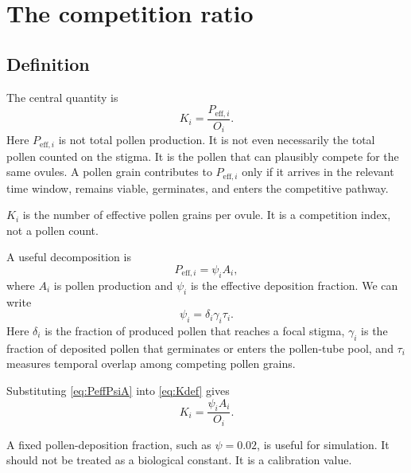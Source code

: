 \documentclass[12pt]{article}
\begin{document}
\section{The competition ratio}

\subsection{Definition}

The central quantity is
\begin{equation}
K_i = \frac{P_{\mathrm{eff},i}}{O_i}.
\label{eq:Kdef}
\end{equation}
Here $P_{\mathrm{eff},i}$ is not total pollen production. It is not even necessarily the total pollen counted on the stigma. It is the pollen that can plausibly compete for the same ovules. A pollen grain contributes to $P_{\mathrm{eff},i}$ only if it arrives in the relevant time window, remains viable, germinates, and enters the competitive pathway.

\begin{definitionbox}
$K_i$ is the number of effective pollen grains per ovule. It is a competition index, not a pollen count.
\end{definitionbox}

A useful decomposition is
\begin{equation}
P_{\mathrm{eff},i} = \psi_i A_i,
\label{eq:PeffPsiA}
\end{equation}
where $A_i$ is pollen production and $\psi_i$ is the effective deposition fraction. We can write
\begin{equation}
\psi_i = \delta_i \gamma_i \tau_i.
\label{eq:psi}
\end{equation}
Here $\delta_i$ is the fraction of produced pollen that reaches a focal stigma, $\gamma_i$ is the fraction of deposited pollen that germinates or enters the pollen-tube pool, and $\tau_i$ measures temporal overlap among competing pollen grains.

Substituting \eqref{eq:PeffPsiA} into \eqref{eq:Kdef} gives
\begin{equation}
K_i = \frac{\psi_i A_i}{O_i}.
\label{eq:KpsiA}
\end{equation}

\begin{cautionbox}
A fixed pollen-deposition fraction, such as $\psi=0.02$, is useful for simulation. It should not be treated as a biological constant. It is a calibration value.
\end{cautionbox}
\end{document}
